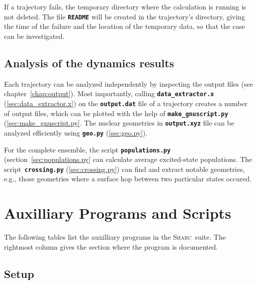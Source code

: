 \documentclass[a4paper,11pt,DIV=15,openany,twoside=false]{scrbook}
\newcommand{\sharc}{\textsc{Sharc}}
\newcommand{\ttt}[1]{\textbf{\texttt{#1}}}
\begin{document}
If a trajectory fails, the temporary directory where the calculation is running is not deleted. The file \ttt{README} will be created in the trajectory's directory, giving the time of the failure and the location of the temporary data, so that the case can be investigated. 

\subsection{Analysis of the dynamics results}

Each trajectory can be analyzed independently by inspecting the output files (see chapter~\ref{chap:output}). Most importantly, calling \ttt{data\_extractor.x} (\ref{sec:data_extractor.x}) on the \ttt{output.dat} file of a trajectory creates a number of output files, which can be plotted with the help of \ttt{make\_gnuscript.py} (\ref{sec:make_gnuscript.py}.
The nuclear geometries in \ttt{output.xyz} file can be analyzed efficiently using \ttt{geo.py} (\ref{sec:geo.py}).

For the complete ensemble, the script \ttt{populations.py} (section~\ref{sec:populations.py} can calculate average excited-state populations. The script~\ttt{crossing.py} (\ref{sec:crossing.py}) can find and extract notable geometries, e.g., those geometries where a surface hop between two particular states occured.

\section{Auxilliary Programs and Scripts}

The following tables list the auxilliary programs in the \sharc\ suite. The rightmost column gives the section where the program is documented.

\subsection{Setup}
\end{document}
